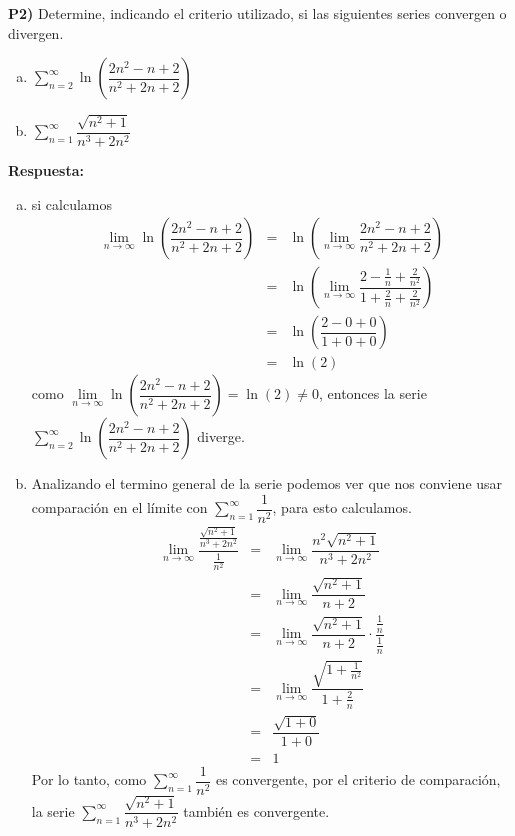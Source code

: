 \documentclass{article}
\begin{document}
\newpage
\noindent\textbf{P2) } Determine, indicando el criterio utilizado, si las siguientes series convergen o divergen.
\begin{enumerate}[a)]
  \item $\displaystyle\sum_{n=2}^{\infty} \ln\left(\dfrac{2n^2-n+2}{n^2+2n+2}\right)$
  \item $\displaystyle\sum_{n=1}^{\infty} \dfrac{\sqrt{n^2+1}}{n^3+2n^2}$
\end{enumerate}


\vspace{5mm}
\noindent\textbf{Respuesta:}
\begin{enumerate}[a)]
  \item si calculamos
    \begin{eqnarray*}
      \lim_{n\to\infty} \ln\left(\dfrac{2n^2-n+2}{n^2+2n+2}\right)
        &=& \ln\left(\lim_{n\to\infty}\dfrac{2n^2-n+2}{n^2+2n+2}\right)\\
        &=& \ln\left(\lim_{n\to\infty}\dfrac{2-\frac{1}{n}+\frac{2}{n^2}}{1+\frac{2}{n}+\frac{2}{n^2}}\right)\\
        &=& \ln\left(\dfrac{2-0+0}{1+0+0}\right)\\
        &=& \ln(2)
    \end{eqnarray*}
    como $\lim\limits_{n\to\infty} \ln\left(\dfrac{2n^2-n+2}{n^2+2n+2}\right) = \ln(2) \neq 0$, entonces la serie $\displaystyle\sum_{n=2}^{\infty} \ln\left(\dfrac{2n^2-n+2}{n^2+2n+2}\right)$ diverge.
  \item Analizando el termino general de la serie podemos ver que nos conviene usar comparación en el límite con $\sum_{n=1}^{\infty} \dfrac{1}{n^2}$, para esto calculamos.
    \begin{eqnarray*}
      \lim_{n\to\infty} \dfrac{\frac{\sqrt{n^2+1}}{n^3+2n^2}}{\frac{1}{n^2}}
        &=& \lim_{n\to\infty} \dfrac{n^2\sqrt{n^2+1}}{n^3+2n^2}\\
        &=& \lim_{n\to\infty} \dfrac{\sqrt{n^2+1}}{n+2}\\
        &=& \lim_{n\to\infty} \dfrac{\sqrt{n^2+1}}{n+2}\cdot\dfrac{\frac{1}{n}}{\frac{1}{n}}\\
        &=& \lim_{n\to\infty} \dfrac{\sqrt{1+\frac{1}{n^2}}}{1+\frac{2}{n}}\\
        &=& \dfrac{\sqrt{1+0}}{1+0}\\
        &=& 1
    \end{eqnarray*}
    Por lo tanto, como $\sum_{n=1}^{\infty} \dfrac{1}{n^2}$ es convergente, por el criterio de comparación, la serie $\sum_{n=1}^{\infty} \dfrac{\sqrt{n^2+1}}{n^3+2n^2}$ también es convergente.
\end{enumerate}
\end{document}
